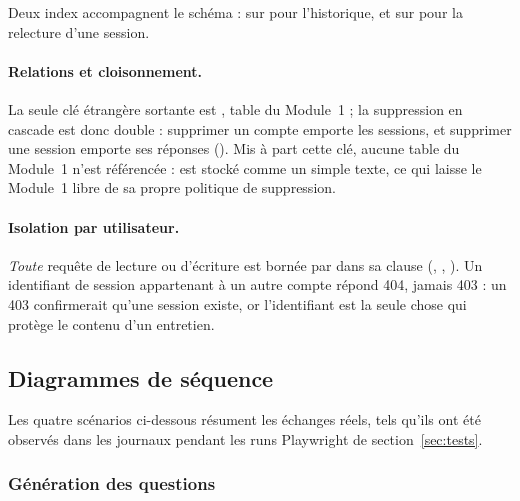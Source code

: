 Deux index accompagnent le schéma :  sur
 pour l'historique, et
 sur  pour la
relecture d'une session.

\paragraph{Relations et cloisonnement.} La seule clé étrangère sortante est
, table du Module~1 ;
la suppression en cascade est donc double : supprimer un compte emporte les
sessions, et supprimer une session emporte ses réponses
(). Mis à part cette clé, aucune table du
Module~1 n'est référencée :  est stocké comme un simple
texte, ce qui laisse le Module~1 libre de sa propre politique de suppression.

\paragraph{Isolation par utilisateur.} \emph{Toute} requête de lecture ou
d'écriture est bornée par  dans sa clause 
(, , ). Un identifiant de session
appartenant à un autre compte répond 404, jamais 403 : un 403 confirmerait
qu'une session existe, or l'identifiant est la seule chose qui protège le
contenu d'un entretien.

\subsection{Diagrammes de séquence}
\label{sec:seq}

Les quatre scénarios ci-dessous résument les échanges réels, tels qu'ils ont
été observés dans les journaux pendant les runs Playwright de
section~\ref{sec:tests}.

\subsubsection{Génération des questions}

